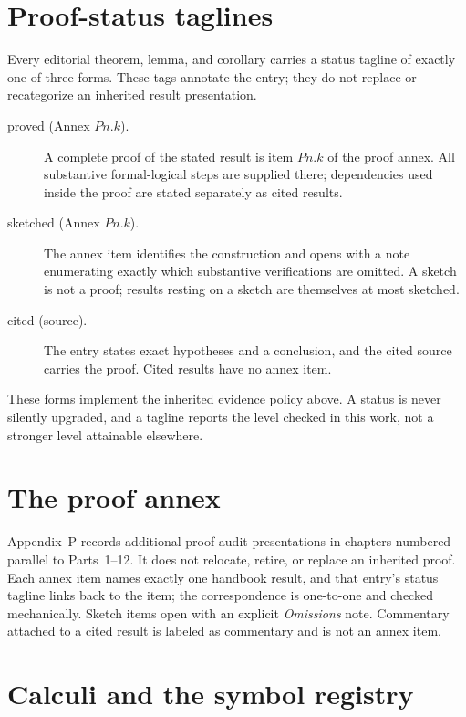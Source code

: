 \section*{Proof-status taglines}

Every editorial theorem, lemma, and corollary carries a status tagline of
exactly one of three forms.  These tags annotate the entry; they do not replace
or recategorize an inherited result presentation.

\begin{description}
  \item[proved (Annex $P n.k$).] A complete proof of the stated result is
        item $P n.k$ of the proof annex.  All substantive formal-logical
        steps are supplied there; dependencies used inside the proof are
        stated separately as cited results.
  \item[sketched (Annex $P n.k$).] The annex item identifies the
        construction and opens with a note enumerating exactly which
        substantive verifications are omitted.  A sketch is not a proof;
        results resting on a sketch are themselves at most sketched.
  \item[cited (source).] The entry states exact hypotheses and a
        conclusion, and the cited source carries the proof.  Cited results
        have no annex item.
\end{description}

These forms implement the inherited evidence policy above.  A status is never
silently upgraded, and a tagline reports the level checked in this work,
not a stronger level attainable elsewhere.

\section*{The proof annex}

Appendix~P records additional proof-audit presentations in chapters numbered
parallel to Parts~1--12.  It does not relocate, retire, or replace an inherited
proof.  Each annex item names exactly one handbook result, and that entry's
status tagline links back to the item; the correspondence is one-to-one and
checked mechanically.  Sketch items open with an explicit \emph{Omissions}
note.  Commentary attached to a cited result is labeled as commentary and is
not an annex item.

\section*{Calculi and the symbol registry}

